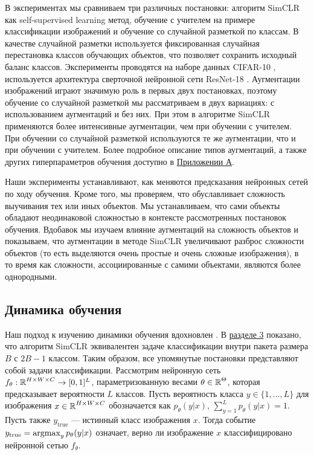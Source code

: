 В экспериментах мы сравниваем три различных постановки: алгоритм SimCLR как self-supervised learning метод, обучение с учителем на примере классификации изображений и обучение со случайной разметкой по классам. В качестве случайной разметки используется фиксированная случайная перестановка классов обучающих объектов, что позволяет сохранить исходный баланс классов. Эксперименты проводятся на наборе данных CIFAR-10 \cite{cifar}, используется архитектура сверточной нейронной сети ResNet-18 \cite{resnet}. Аугментации изображений играют значимую роль в первых двух постановках, поэтому обучение со случайной разметкой мы рассматриваем в двух вариациях: с использованием аугментаций и без них. При этом в алгоритме SimCLR применяются более интенсивные аугментации, чем при обучении с учителем. При обучении со случайной разметкой используются те же аугментации, что и при обучении с учителем. Более подробное описание типов аугментаций, а также других гиперпараметров обучения доступно в \hyperref[appendix:1]{Приложении А}.

Наши эксперименты устанавливают, как меняются предсказания нейронных сетей по ходу обучения. Кроме того, мы проверяем, что обуславливает сложность выучивания тех или иных объектов. Мы устанавливаем, что сами объекты обладают неодинаковой сложностью в контексте рассмотренных постановок обучения. Вдобавок мы изучаем влияние аугментаций на сложность объектов и показываем, что аугментации в методе SimCLR увеличивают разброс сложности объектов (то есть выделяются очень простые и очень сложные изображения), в то время как сложности, ассоциированные с самими объектами, являются более однородными.

\subsection{Динамика обучения}

Наш подход к изучению динамики обучения вдохновлен \cite{memorization}. В \hyperref[simclr:1]{разделе 3} показано, что алгоритм SimCLR эквивалентен задаче классификации внутри пакета размера $B$ с $2B-1$ классом. Таким образом, все упомянутые постановки представляют собой задачи классификации. Рассмотрим нейронную сеть $f_{\theta}: \operatorname{\mathbb{R}}^{H \times W \times C} \rightarrow [0, 1]^L$, параметризованную весами $\theta \in \operatorname{\mathbb{R}}^{\Theta}$, которая предсказывает вероятности $L$ классов. Пусть вероятность класса $y \in \{1, \dots, L\}$ для изображения $x \in \operatorname{\mathbb{R}}^{H \times W \times C}$ обозначается как $p_{\theta}(y|x)$, $\sum_{y=1}^L p_{\theta}(y|x)=1$. Пусть также $y_{\text{true}}$ --- истинный класс изображения $x$. Тогда событие $y_{\text{true}} = \operatorname*{argmax}_{y} p_{\theta}(y|x)$ означает, верно ли изображение $x$ классифицировано нейронной сетью $f_{\theta}$.

